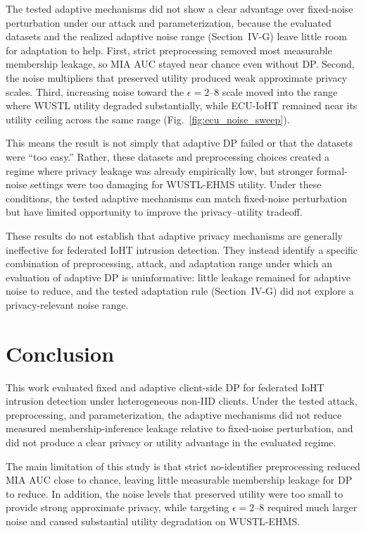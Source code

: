 \documentclass[conference]{IEEEtran}
\begin{document}
The tested adaptive mechanisms did not show a clear advantage over fixed-noise
perturbation under our attack and parameterization, because the evaluated
datasets and the realized adaptive noise range (Section~IV-G) leave little room
for adaptation to help. First, strict preprocessing removed most measurable
membership leakage, so MIA AUC stayed near chance even without DP. Second, the
noise multipliers that preserved utility produced weak approximate privacy
scales. Third, increasing noise toward the \(\epsilon=2\)--8 scale moved into
the range where WUSTL utility degraded substantially, while ECU-IoHT remained
near its utility ceiling across the same range
(Fig.~\ref{fig:ecu_noise_sweep}).

This means the result is not simply that adaptive DP failed or that the datasets
were ``too easy.'' Rather, these datasets and preprocessing choices created a
regime where privacy leakage was already empirically low, but stronger
formal-noise settings were too damaging for WUSTL-EHMS utility. Under these
conditions, the tested adaptive mechanisms can match fixed-noise perturbation
but have limited opportunity to improve the privacy--utility tradeoff.

These results do not establish that adaptive privacy mechanisms are generally
ineffective for federated IoHT intrusion detection. They instead identify a
specific combination of preprocessing, attack, and adaptation range under which
an evaluation of adaptive DP is uninformative: little leakage remained for
adaptive noise to reduce, and the tested adaptation rule (Section~IV-G) did not
explore a privacy-relevant noise range.

\section{Conclusion}

This work evaluated fixed and adaptive client-side DP for federated IoHT
intrusion detection under heterogeneous non-IID clients. Under the tested
attack, preprocessing, and parameterization, the adaptive mechanisms did not
reduce measured membership-inference leakage relative to fixed-noise
perturbation, and did not produce a clear privacy or utility advantage in the
evaluated regime.

The main limitation of this study is that strict no-identifier preprocessing
reduced MIA AUC close to chance, leaving little measurable membership leakage
for DP to reduce. In addition, the noise levels that preserved utility were too
small to provide strong approximate privacy, while targeting \(\epsilon=2\)--8
required much larger noise and caused substantial utility degradation on
WUSTL-EHMS.
\end{document}
